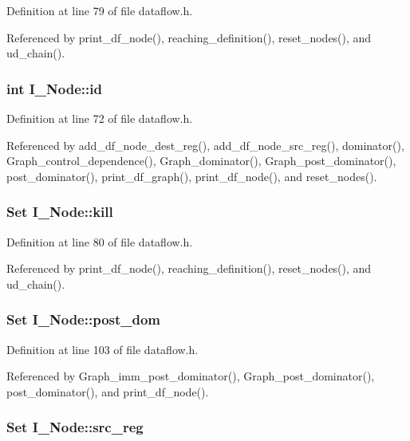 Definition at line 79 of file dataflow.h.

Referenced by print\_\-df\_\-node(), reaching\_\-definition(), reset\_\-nodes(), and ud\_\-chain().
\subsubsection{\setlength{\rightskip}{0pt plus 5cm}int \bf{I\_\-Node::id}}\label{structI__Node_c0657bf22e46774ee23b9b4a7befaccd}




Definition at line 72 of file dataflow.h.

Referenced by add\_\-df\_\-node\_\-dest\_\-reg(), add\_\-df\_\-node\_\-src\_\-reg(), dominator(), Graph\_\-control\_\-dependence(), Graph\_\-dominator(), Graph\_\-post\_\-dominator(), post\_\-dominator(), print\_\-df\_\-graph(), print\_\-df\_\-node(), and reset\_\-nodes().
\subsubsection{\setlength{\rightskip}{0pt plus 5cm}\bf{Set} \bf{I\_\-Node::kill}}\label{structI__Node_c1d2b1821f41e38cb1bca52d269de3e4}




Definition at line 80 of file dataflow.h.

Referenced by print\_\-df\_\-node(), reaching\_\-definition(), reset\_\-nodes(), and ud\_\-chain().
\subsubsection{\setlength{\rightskip}{0pt plus 5cm}\bf{Set} \bf{I\_\-Node::post\_\-dom}}\label{structI__Node_09b23dafc6c2e87dd8cec105a8f17c96}




Definition at line 103 of file dataflow.h.

Referenced by Graph\_\-imm\_\-post\_\-dominator(), Graph\_\-post\_\-dominator(), post\_\-dominator(), and print\_\-df\_\-node().
\subsubsection{\setlength{\rightskip}{0pt plus 5cm}\bf{Set} \bf{I\_\-Node::src\_\-reg}}\label{structI__Node_524f7afdb5521f2461e1bbcce499a623}




